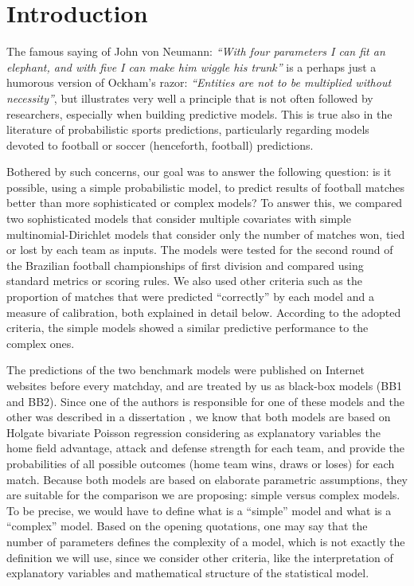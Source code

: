 \documentclass[journal,article,accept,moreauthors,pdftex,12pt,a4paper]{mdpi}
\begin{document}

    \section{Introduction}

    The famous saying of John von Neumann: {\it ``With four parameters I can fit an elephant, and with five I can make him wiggle his trunk''} is a perhaps just a humorous version of Ockham's razor:
    {\it``Entities are not to be multiplied without necessity''}, but illustrates very well a principle that is not often followed by researchers, especially when building predictive models.
    This is true also in the literature of probabilistic sports predictions, particularly regarding models devoted to football or soccer (henceforth, football) predictions.

    Bothered by such concerns, our goal was to answer the following question: is it possible, using a simple probabilistic model, to predict results of football matches better than more sophisticated or complex models?
    To answer this, we compared two sophisticated models that consider multiple covariates with simple multinomial-Dirichlet models that consider only the number of matches won, tied or lost by each team as inputs.
    The models were tested for the second round of the Brazilian football championships of first division and compared using standard metrics or scoring rules.
    We also used other criteria such as the proportion of matches that were predicted ``correctly'' by each model and a measure of calibration, both explained in detail below.
    According to the adopted criteria, the simple models showed a similar predictive performance to the complex ones.

    The predictions of the two benchmark models were published on Internet websites before every matchday, and are treated by us as black-box models (BB1 and BB2).
    Since one of the authors is responsible for one of these models and the other was described in a dissertation \citep{arruda2000}, we know that both models are based on Holgate bivariate Poisson regression considering as explanatory variables the home field advantage, attack and defense strength for each team, and provide the probabilities of all possible outcomes (home team wins, draws or loses) for each match.
    Because both models are based on elaborate parametric assumptions, they are suitable for the comparison we are proposing: simple versus complex models. To be precise, we would have to define what is a ``simple'' model and what is a ``complex'' model. Based on the opening quotations, one may say that the number of parameters defines the complexity of a model, which is not exactly the definition we will use, since we consider other criteria, like the interpretation of explanatory variables and mathematical structure of the statistical model.
\end{document}
